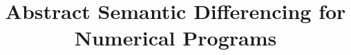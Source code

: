 \documentclass{llncs}
\begin{document}
\title{Abstract Semantic Differencing for Numerical Programs}


\maketitle













%

\begin{spacing}{0.95}


\end{spacing}
\end{document}

